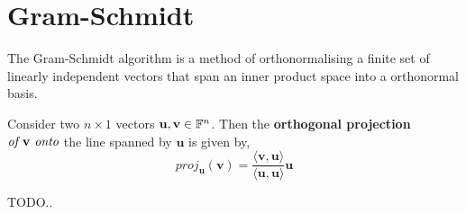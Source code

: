 \section{Gram-Schmidt} %
\label{sec:gram-schmidt}

The Gram-Schmidt algorithm is a method of orthonormalising
a finite set of linearly independent vectors that span an
inner product space into a orthonormal basis.

\begin{defn}
	Consider two $n \times 1$ vectors $\mathbf{u},\mathbf{v} \in \mathbb{F}^n$.
	Then the \textbf{orthogonal projection}
	$\emph{of } \mathbf{v} \emph{ onto}$ the line spanned by $\mathbf{u}$
	is given by,
	\[
		proj_{\mathbf{u}} (\mathbf{v})
		= \frac{\langle \mathbf{v},\mathbf{u} \rangle}
		{\langle \mathbf{u}, \mathbf{u} \rangle} \mathbf{u}
	\]
\end{defn}

TODO..
